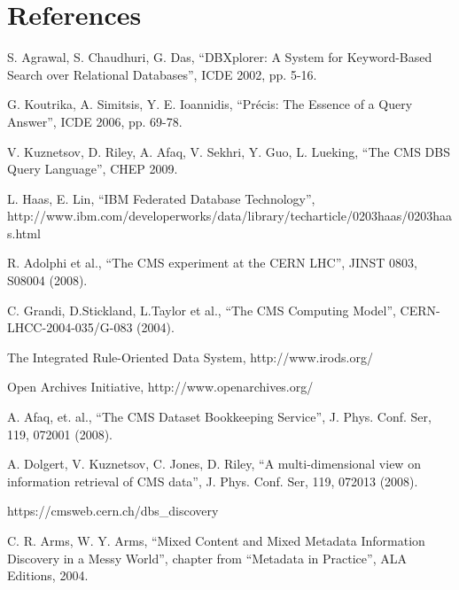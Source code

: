 \documentclass[3p,times]{elsarticle}
\begin{document}



\section*{References}
\begin{thebibliography}{00}
S. Agrawal, S. Chaudhuri, G. Das,
``DBXplorer: A System for Keyword-Based Search over Relational Databases'',
ICDE 2002, pp. 5-16.

G. Koutrika, A. Simitsis, Y. E. Ioannidis,
``Pr\'{e}cis: The Essence of a Query Answer'',
ICDE 2006, pp. 69-78.

V. Kuznetsov, D. Riley, A. Afaq, V. Sekhri, Y. Guo, L. Lueking,
``The CMS DBS Query Language'', CHEP 2009.


L. Haas, E. Lin,
``IBM Federated Database Technology'', \\
http://www.ibm.com/developerworks/data/library/techarticle/0203haas/0203haas.html

R. Adolphi et al., 
``The CMS experiment at the CERN LHC'',
JINST 0803, S08004 (2008).

C. Grandi, D.Stickland, L.Taylor et al.,
``The CMS Computing Model'',
CERN-LHCC-2004-035/G-083 (2004).

The Integrated Rule-Oriented Data System,
http://www.irods.org/

Open Archives Initiative,
http://www.openarchives.org/

A. Afaq, et. al.,
``The CMS Dataset Bookkeeping Service'', 
J. Phys. Conf. Ser, 119, 072001 (2008).

A. Dolgert, V. Kuznetsov, C. Jones, D. Riley, 
``A multi-dimensional view on information retrieval of CMS data'',
J. Phys. Conf. Ser, 119, 072013 (2008).

 https://cmsweb.cern.ch/dbs\_discovery

C. R. Arms, W. Y. Arms,
 ``Mixed Content and Mixed Metadata 
Information Discovery in a Messy World'',
chapter from ``Metadata in Practice'', ALA Editions, 2004.


\end{thebibliography}
\end{document}
